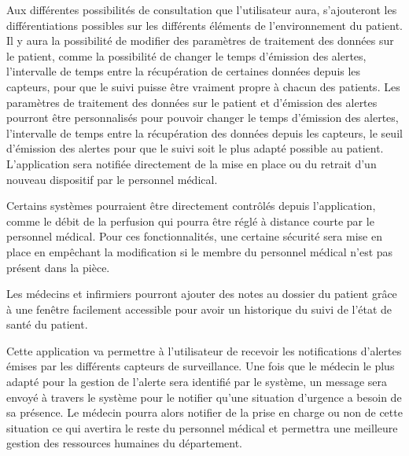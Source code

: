 Aux différentes possibilités de consultation que l’utilisateur aura, s’ajouteront les différentiations possibles sur les différents
éléments de l’environnement du patient. Il y aura la possibilité de modifier des paramètres de traitement des données sur le
patient, comme la possibilité de changer le temps d’émission des alertes, l’intervalle de temps entre la récupération de certaines
données depuis les capteurs, pour que le suivi puisse être vraiment propre à chacun des patients. Les paramètres de
traitement des données sur le patient et d’émission des alertes pourront être personnalisés pour pouvoir changer le temps
d’émission des alertes, l’intervalle de temps entre la récupération des données depuis les capteurs, le seuil d’émission des
alertes pour que le suivi soit le plus adapté possible au patient. L’application sera notifiée directement de la mise en place ou du
retrait d’un nouveau dispositif par le personnel médical. 

Certains systèmes pourraient être directement contrôlés depuis l’application, comme le débit de la perfusion qui pourra être réglé à distance courte par le personnel médical. Pour ces fonctionnalités, une certaine sécurité sera mise en place en empêchant la modification si le membre du personnel médical n’est pas présent dans la pièce.

Les médecins et infirmiers pourront ajouter des notes au dossier du patient grâce à une fenêtre facilement accessible pour avoir un historique du suivi de l’état de santé du patient.

Cette application va permettre à l’utilisateur de recevoir les notifications d’alertes émises par les différents capteurs de
surveillance. Une fois que le médecin le plus adapté pour la gestion de l’alerte sera identifié par le système, un message sera
envoyé à travers le système pour le notifier  qu’une situation d’urgence a besoin de sa présence. Le médecin pourra alors notifier
de la prise en charge ou non de cette situation ce qui avertira le reste du personnel médical et permettra une meilleure gestion des ressources humaines du département.
